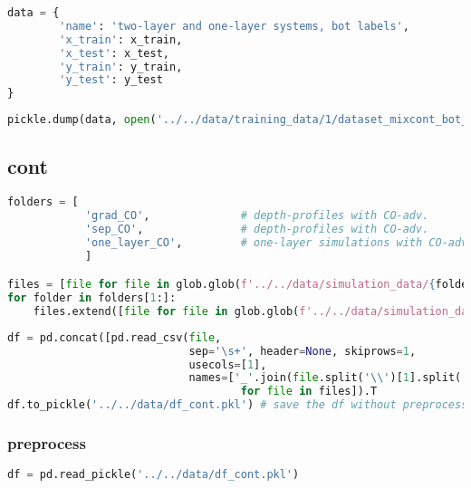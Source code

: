 \begin{lstlisting}[language=Python]
data = {
        'name': 'two-layer and one-layer systems, bot labels',
        'x_train': x_train,
        'x_test': x_test,
        'y_train': y_train,
        'y_test': y_test
}
\end{lstlisting}

\begin{lstlisting}[language=Python]
pickle.dump(data, open('../../data/training_data/1/dataset_mixcont_bot_layer.pkl', 'wb'))
\end{lstlisting}

\hypertarget{cont}{%
\subsection*{cont}\label{cont}}

\begin{lstlisting}[language=Python]
folders = [
            'grad_CO',              # depth-profiles with CO-adv.       with gradient layers
            'sep_CO',               # depth-profiles with CO-adv.       with separated layers
            'one_layer_CO',         # one-layer simulations with CO-adv.
            ]

files = [file for file in glob.glob(f'../../data/simulation_data/{folders[0]}/*.spc')]
for folder in folders[1:]:
    files.extend([file for file in glob.glob(f'../../data/simulation_data/{folder}/*.spc')])
\end{lstlisting}

\begin{lstlisting}[language=Python]
df = pd.concat([pd.read_csv(file,
                            sep='\s+', header=None, skiprows=1,
                            usecols=[1],
                            names=['_'.join(file.split('\\')[1].split('_')[:-1])]).T 
                                    for file in files]).T
df.to_pickle('../../data/df_cont.pkl') # save the df without preprocessing
\end{lstlisting}

\hypertarget{preprocess-1}{%
\subsubsection*{preprocess}\label{preprocess-1}}

\begin{lstlisting}[language=Python]
df = pd.read_pickle('../../data/df_cont.pkl') 
\end{lstlisting}

